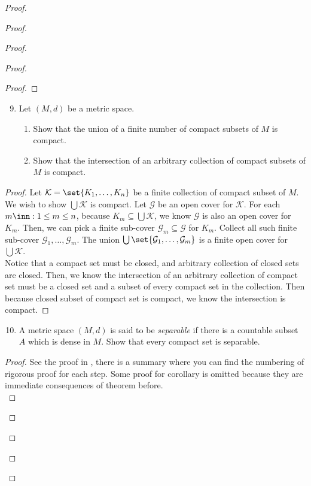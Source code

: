 \documentclass{report}
\begin{document}
\begin{proof}
\begin{proof}
\begin{proof}
\begin{proof}
\begin{proof}
\end{proof}
\begin{question}{}{}
\begin{enumerate}
    \setcounter{enumi}{8}
    \item Let \( (M, d) \) be a metric space.
    \begin{enumerate}
        \item Show that the union of a finite number of compact subsets of \( M \) is compact.
        \item Show that the intersection of an arbitrary collection of compact subsets of \( M \) is compact.
    \end{enumerate}
\end{enumerate}
\end{question}
\begin{proof}
  Let $\mathcal{K}=\set{K_1,\dots , K_n}$ be a finite collection of compact subset of $M$. We wish to show $\bigcup  \mathcal{K}$ is compact. Let $\mathcal{G}$ be an open cover for $\mathcal{K}$. For each $m \inn:1\leq m\leq n$, because $K_m\subseteq \bigcup \mathcal{K}$, we know $\mathcal{G}$ is also an open cover for $K_m$. Then, we can pick a finite sub-cover  $\mathcal{G}_m\subseteq \mathcal{G}$ for $K_m$. Collect all such finite sub-cover  $\mathcal{G}_1,\dots, \mathcal{G}_m$. The union $\bigcup \set{\mathcal{G}_1,\dots ,\mathcal{G}_m}$ is a finite open cover for $\bigcup \mathcal{K} $.\\

Notice that a compact set must be closed, and arbitrary collection of closed sets are closed. Then, we know the intersection of an arbitrary collection of compact set must be a closed set and a subset of every compact set in the collection. Then because closed subset of compact set is compact, we know the intersection is compact.
\end{proof}
\begin{question}{}{}
\begin{enumerate}
    \setcounter{enumi}{9}
    \item A metric space \( (M,d) \) is said to be \textit{separable} if there is a countable subset \( A \) which is dense in \( M \). Show that every compact set is separable.
\end{enumerate}
\end{question}
\begin{proof}
See the proof in , there is a summary where you can find the numbering of rigorous proof for each step. Some proof for corollary is omitted because they are immediate consequences of theorem before.\\


\end{proof}
\end{proof}
\end{proof}
\end{proof}
\end{proof}
\end{document}

